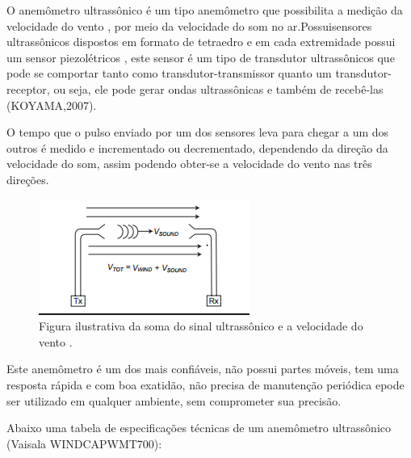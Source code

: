 \begin{enumerate}
	O anemômetro ultrassônico é um tipo anemômetro que possibilita a medição da velocidade do vento , por meio da velocidade
	do som no ar.Possuisensores ultrassônicos dispostos em formato de tetraedro e em cada extremidade possui um sensor
	piezolétricos \cite{ribeiro06}, este sensor é um tipo de transdutor ultrassônicos que pode se comportar tanto
	como transdutor-transmissor quanto um transdutor-receptor, ou seja, ele pode gerar ondas ultrassônicas e também de
	recebê-las (KOYAMA,2007).
	
	O tempo que o pulso enviado por um dos sensores leva para chegar a um dos outros é medido e incrementado ou decrementado,
	dependendo da direção da velocidade do som, assim podendo obter-se a velocidade do vento nas três direções.
	
	\begin{figure}[!h]
	  \centering
	  \includegraphics[scale=0.8]{editaveis/figuras/sinal_ultrasonico}
	  \caption[Soma do sinal ultrassônico e a velocidade do vento]
	    {Figura ilustrativa da soma do sinal ultrassônico e a velocidade do vento \cite{cyliax06}.}
	  \FloatBarrier
	  \label{sinal_ultrasonico}
	\end{figure}
	
	Este anemômetro é um dos mais confiáveis, não possui partes móveis, tem uma resposta rápida e com boa exatidão, não
	precisa de manutenção periódica epode ser utilizado em qualquer ambiente, sem comprometer sua precisão.
	
	Abaixo uma tabela de especificações técnicas de um anemômetro ultrassônico (Vaisala WINDCAP\textregistered WMT700):
	

\end{enumerate}

